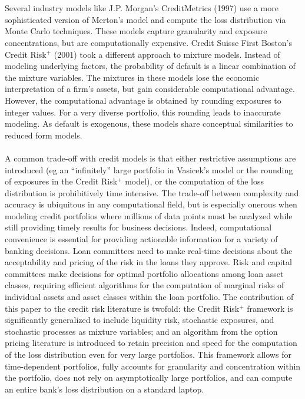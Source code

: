 \documentclass[12pt]{article}
\theoremstyle{definition}
\begin{document}
\\
\\
Several industry models like J.P. Morgan's CreditMetrics (1997) use a more sophisticated version of Merton's model and compute the loss distribution via Monte Carlo techniques.  These models capture granularity and exposure concentrations, but are computationally expensive.  Credit Suisse First Boston's Credit Risk\(^+\) (2001) took a different approach to mixture models.  Instead of modeling underlying factors, the probability of default is a linear combination of the mixture variables.  The mixtures in these models lose the economic interpretation of a firm's assets, but gain considerable computational advantage.  However, the computational advantage is obtained by rounding exposures to integer values.  For a very diverse portfolio, this rounding leads to inaccurate modeling.  As default is exogenous, these models share conceptual similarities to reduced form models. 
\\
\\
A common trade-off with credit models is that either restrictive assumptions are introduced (eg an ``infinitely'' large portfolio in Vasicek's model or the rounding of exposures in the Credit Risk\(^+\) model), or the computation of the loss distribution is prohibitively time intensive.  The trade-off between complexity and accuracy is ubiquitous in any computational field, but is especially onerous when modeling credit portfolios where millions of data points must be analyzed while still providing timely results for business decisions. Indeed, computational convenience is essential for providing actionable information for a variety of banking decisions.  Loan committees need to make real-time decisions about the acceptability and pricing of the risk in the loans they approve.  Risk and capital committees make decisions for optimal portfolio allocations among loan asset classes, requiring efficient algorithms for the computation of marginal risks of individual assets and asset classes within the loan portfolio.  The contribution of this paper to the credit risk literature is twofold: the Credit Risk\(^+\) framework is significantly generalized to include liquidity risk, stochastic  exposures, and stochastic processes as mixture variables; and an algorithm from the option pricing literature is introduced to retain precision and speed for the computation of the loss distribution even for very large portfolios.  This framework allows for time-dependent portfolios, fully accounts for granularity and concentration within the portfolio, does not rely on asymptotically large portfolios, and can compute an entire bank's loss distribution on a standard laptop.  
\newpage
\end{document}
